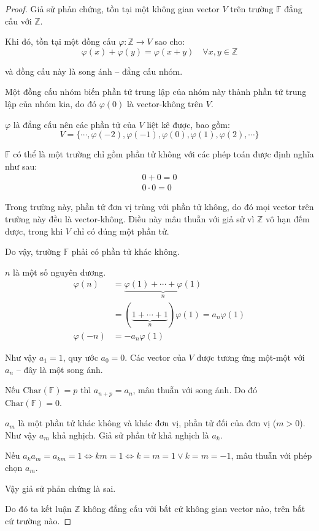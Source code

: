\documentclass[class=linearalgebra,crop=false]{standalone}
\begin{document}
\begin{proof}Giả sử phản chứng, tồn tại một không gian vector $V$ trên trường $\mathbb{F}$ đẳng cấu với $\mathbb{Z}$.
    \par Khi đó, tồn tại một đồng cấu $\varphi: \mathbb{Z}\rightarrow V$ sao cho:
    \[ \varphi(x) + \varphi(y) = \varphi(x + y)\quad\forall x, y\in\mathbb{Z} \]
    \par và đồng cấu này là song ánh -- đẳng cấu nhóm.
    \par Một đồng cấu nhóm biến phần tử trung lập của nhóm này thành phần tử trung lập của nhóm kia, do đó $\varphi(0)$ là vector-không trên $V$.
    \par $\varphi$ là đẳng cấu nên các phần tử của $V$ liệt kê được, bao gồm:
    \[ V = \{ \cdots, \varphi(-2), \varphi(-1), \varphi(0), \varphi(1), \varphi(2), \cdots \} \]
    \par $\mathbb{F}$ có thể là một trường chỉ gồm phần tử không với các phép toán được định nghĩa như sau:
    \begin{align*}
        0 + 0 = 0 \\
        0\cdot 0 = 0
    \end{align*}
    \par Trong trường này, phần tử đơn vị trùng với phần tử không, do đó mọi vector trên trường này đều là vector-không. Điều này mâu thuẫn với giả sử vì $\mathbb{Z}$ vô hạn đếm được, trong khi $V$ chỉ có đúng một phần tử.
    \par Do vậy, trường $\mathbb{F}$ phải có phần tử khác không.
    \par $n$ là một số nguyên dương.
    \begin{align*}
        \varphi(n)  & =\underbrace{\varphi(1) + \cdots + \varphi(1)}_{n}            \\
                    & =(\underbrace{1 + \cdots + 1}_{n})\varphi(1) =a_{n}\varphi(1) \\
        \varphi(-n) & =-a_{n}\varphi(1)
    \end{align*}
    \par Như vậy $a_{1} = 1$, quy ước $a_{0} = 0$. Các vector của $V$ được tương ứng một-một với $a_{n}$ -- đây là một song ánh.
    \par Nếu $\text{Char}(\mathbb{F}) = p$ thì $a_{n + p} = a_{n}$, mâu thuẫn với song ánh. Do đó $\text{Char}(\mathbb{F}) = 0$.
    \par $a_{m}$ là một phần tử khác không và khác đơn vị, phần tử đối của đơn vị ($m > 0$). Như vậy $a_{m}$ khả nghịch. Giả sử phần tử khả nghịch là $a_{k}$.
    \par Nếu $a_{k}a_{m} = a_{km} = 1 \Leftrightarrow km = 1 \Leftrightarrow k = m = 1 \vee k = m = -1$, mâu thuẫn với phép chọn $a_{m}$.
    \par Vậy giả sử phản chứng là sai.
    \par Do đó ta kết luận $\mathbb{Z}$ không đẳng cấu với bất cứ không gian vector nào, trên bất cứ trường nào.
\end{proof}
\end{document}
